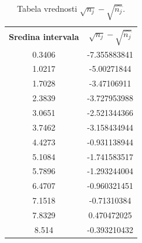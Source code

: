 \documentclass{article}
\begin{document}
\begin{table}[H]
    \centering
    \begin{tabular}{c c}
        \bf{Sredina intervala}  &	$\sqrt{n_j} - \sqrt{\hat{n_j}}$   \\
        0.3406   &	  -7.355883841   \\
        1.0217   &	  -5.00271844    \\
        1.7028   &	  -3.47106911    \\
        2.3839   &	  -3.727953988   \\
        3.0651   &	  -2.521344366   \\
        3.7462   &	  -3.158434944   \\
        4.4273   &	  -0.931138944   \\
        5.1084   &	  -1.741583517   \\
        5.7896   &	  -1.293244004   \\
        6.4707   &	  -0.960321451   \\
        7.1518   &	  -0.71310384    \\
        7.8329   &	  0.470472025    \\
        8.514    &	  -0.393210432   \\
    \end{tabular}
    \caption{Tabela vrednosti $\sqrt{n_j} - \sqrt{\hat{n_j}}$.}
\end{table}
\end{document}
